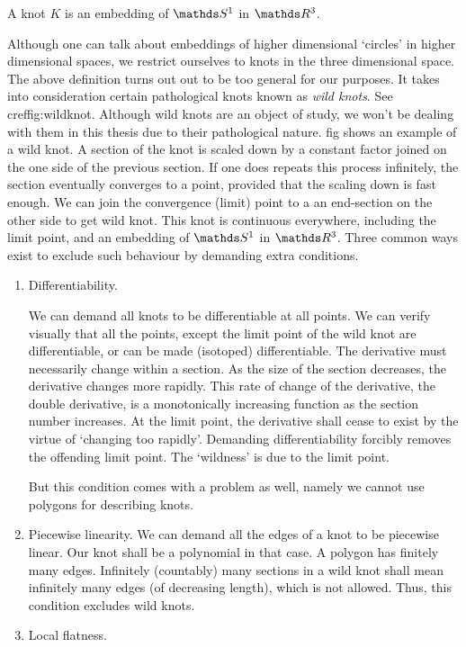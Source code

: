 \begin{defn}[Knot]
    A knot \(K\) is an embedding of \(\sone\) in \(\rthree\).
\end{defn}
Although one can talk about embeddings of higher dimensional `circles' in higher dimensional spaces, we restrict ourselves to knots in the three dimensional space. The above definition turns out out to be too general for our purposes. It takes into consideration certain pathological knots known as \textit{wild knots}. See cref{fig:wildknot}. Although wild knots are an object of study, we won't be dealing with them in this thesis due to their pathological nature. fig shows an example of a wild knot. A section of the knot is scaled down by a constant factor joined on the one side of the previous section. If one does repeats this process infinitely, the section eventually converges to a point, provided that the scaling down is fast enough. We can join the convergence (limit) point to a an end-section on the other side to get wild knot. This knot is continuous everywhere, including the limit point, and an embedding of \(\sone\) in \(\rthree\). Three common ways exist to exclude such behaviour by demanding extra conditions.
\begin{enumerate}
    \item Differentiability.

    We can demand all knots to be differentiable at all points. We can verify visually that all the points, except the limit point of the wild knot are differentiable, or can be made (isotoped) differentiable. The derivative must necessarily change within a section. As the size of the section decreases, the derivative changes more rapidly. This rate of change of the derivative, the double derivative, is a monotonically increasing function as the section number increases. At the limit point, the derivative shall cease to exist by the virtue of `changing too rapidly'. Demanding differentiability forcibly removes the offending limit point. The `wildness' is due to the limit point.

    But this condition comes with a problem as well, namely we cannot use polygons for describing knots.
    \item Piecewise linearity.
    We can demand all the edges of a knot to be piecewise linear. Our knot shall be a polynomial in that case. A polygon has finitely many edges. Infinitely (countably) many sections in a wild knot shall mean infinitely many edges (of decreasing length), which is not allowed. Thus, this condition excludes wild knots.
    \item Local flatness.
\end{enumerate}
